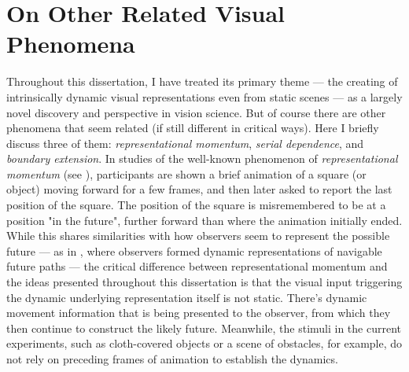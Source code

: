 \section{On Other Related Visual Phenomena}

Throughout this dissertation, I have treated its primary theme — the creating of intrinsically dynamic visual representations even from static scenes — as a largely novel discovery and perspective in vision science.  But of course there are other phenomena that seem related (if still different in critical ways).  Here I briefly discuss three of them: \textit{representational momentum},  \textit{serial dependence}, and  \textit{boundary extension}.  In studies of the well-known phenomenon of \textit{representational momentum} (see \cite{hubbard_representational_2005}), participants are shown a brief animation of a square (or object) moving forward for a few frames, and then later asked to report the last position of the square.  The position of the square is misremembered to be at a position "in the future", further forward than where the animation initially ended.  While this shares similarities with how observers seem to represent the possible future --- as in , where observers formed dynamic representations of navigable future paths — the critical difference between representational momentum and the ideas presented throughout this dissertation is that the visual input triggering the dynamic underlying representation itself is not static. There's dynamic movement information that is being presented to the observer, from which they then continue to construct the likely future.  Meanwhile, the stimuli in the current experiments, such as cloth-covered objects or a scene of obstacles, for example, do not rely on preceding frames of animation to establish the dynamics.


